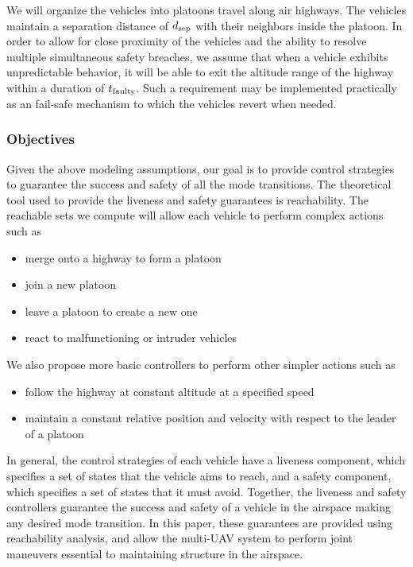 We will organize the vehicles into platoons travel along air highways. The vehicles maintain a separation distance of $d_\text{sep}$ with their neighbors inside the platoon. In order to allow for close proximity of the vehicles and the ability to resolve multiple simultaneous safety breaches, we assume that when a vehicle exhibits unpredictable behavior, it will be able to exit the altitude range of the highway within a duration of $t_\text{faulty}$. Such a requirement may be implemented practically as an fail-safe mechanism to which the vehicles revert when needed.

\subsubsection{Objectives}
Given the above modeling assumptions, our goal is to provide control strategies to guarantee the success and safety of all the mode transitions. The theoretical tool used to provide the liveness and safety guarantees is reachability. The reachable sets we compute will allow each vehicle to perform complex actions such as 


\begin{itemize}
\item merge onto a highway to form a platoon
\item join a new platoon
\item leave a platoon to create a new one
\item react to malfunctioning or intruder vehicles
\end{itemize}

We also propose more basic controllers to perform other simpler actions such as
\begin{itemize}
\item follow the highway at constant altitude at a specified speed
\item maintain a constant relative position and velocity with respect to the leader of a platoon
\end{itemize}

In general, the control strategies of each vehicle have a liveness component, which specifies a set of states that the vehicle aims to reach, and a safety component, which specifies a set of states that it must avoid. Together, the liveness and safety controllers guarantee the success and safety of a vehicle in the airspace making any desired mode transition. In this paper, these guarantees are provided using reachability analysis, and allow the multi-UAV system to perform joint maneuvers essential to maintaining structure in the airspace.
